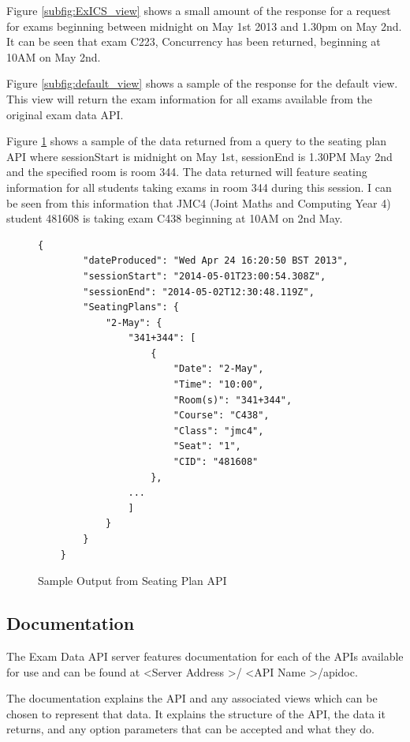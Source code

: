 Figure \ref{subfig:ExICS_view} shows a small amount of the response for a request for exams beginning between midnight on May 1st 2013 and 1.30pm on May 2nd.  It can be seen that exam C223, Concurrency has been returned, beginning at 10AM on May 2nd.

Figure \ref{subfig:default_view} shows a sample of the response for the default view.  This view will return the exam information for all exams available from the original exam data API.

\FloatBarrier
\FloatBarrier

Figure \ref{subfig:seating_plan} shows a sample of the data returned from a query to the seating plan API where sessionStart is midnight on May 1st, sessionEnd is 1.30PM May 2nd and the specified room is room 344.  The data returned will feature seating information for all students taking exams in room 344 during this session.  I can be seen from this information that JMC4 (Joint Maths and Computing Year 4) student 481608 is taking exam C438 beginning at 10AM on 2nd May.

\begin{figure}[h]
	\centering
	\lstset{language=JSON}
	\begin{lstlisting}[tabsize=2,breaklines=true]
	{
		"dateProduced": "Wed Apr 24 16:20:50 BST 2013",
		"sessionStart": "2014-05-01T23:00:54.308Z",
		"sessionEnd": "2014-05-02T12:30:48.119Z",
		"SeatingPlans": {
			"2-May": {
				"341+344": [
					{
						"Date": "2-May",
						"Time": "10:00",
						"Room(s)": "341+344",
						"Course": "C438",
						"Class": "jmc4",
						"Seat": "1",
						"CID": "481608"
					},
				...
				]
			}
		}
	}
	\end{lstlisting}
	\caption{Sample Output from Seating Plan API}
	\label{subfig:seating_plan}
\end{figure}

\FloatBarrier

\subsection{Documentation}

\FloatBarrier

The Exam Data API server features documentation for each of the APIs available for use and can be found at \textless Server Address \textgreater / \textless API Name \textgreater /apidoc.

The documentation explains the API and any associated views which can be chosen to represent that data.  It explains the structure of the API, the data it returns, and any option parameters that can be accepted and what they do.


